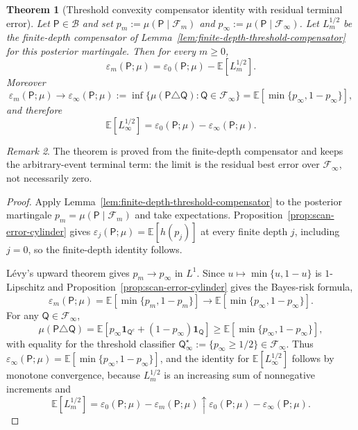 \documentclass{etds}%
\numberwithin{equation}{section}
\theoremstyle{plain}
\newtheorem{theorem}{Theorem}[section]
\theoremstyle{definition}
\theoremstyle{remark}
\newtheorem{remark}[theorem]{Remark}
\newcommand{\EE}{\mathbb{E}}
\newcommand{\ind}{\mathbf{1}}
\begin{document}
\begin{theorem}[Threshold convexity compensator identity with residual terminal error]
\label{thm:scan-tanaka}
Let $\mathsf{P}\in\mathcal{B}$ and set
$p_m:=\mu(\mathsf{P}\mid\mathcal{F}_m)$ and
$p_\infty:=\mu(\mathsf{P}\mid\mathcal{F}_\infty)$.  Let $L_m^{1/2}$ be the
finite-depth compensator of
Lemma~\ref{lem:finite-depth-threshold-compensator} for this posterior
martingale.  Then for every $m\ge0$,
\[
\varepsilon_m(\mathsf{P};\mu)
=\varepsilon_0(\mathsf{P};\mu)-\EE[L_m^{1/2}].
\]
Moreover
\[
\varepsilon_m(\mathsf{P};\mu)\to
\varepsilon_\infty(\mathsf{P};\mu)
:=\inf\{\mu(\mathsf{P}\triangle\mathsf{Q}):\mathsf{Q}\in\mathcal{F}_\infty\}
=\EE[\min\{p_\infty,1-p_\infty\}],
\]
and therefore
\[
\EE[L_\infty^{1/2}]
=\varepsilon_0(\mathsf{P};\mu)-\varepsilon_\infty(\mathsf{P};\mu).
\]
\end{theorem}

\begin{remark}
The theorem is proved from the finite-depth compensator and keeps the
arbitrary-event terminal term: the limit is the residual best error over
$\mathcal{F}_\infty$, not necessarily zero.
\end{remark}

\begin{proof}
Apply Lemma~\ref{lem:finite-depth-threshold-compensator} to the posterior
martingale $p_m=\mu(\mathsf{P}\mid\mathcal{F}_m)$ and take expectations.
Proposition~\ref{prop:scan-error-cylinder} gives
$\varepsilon_j(\mathsf{P};\mu)=\EE[h(p_j)]$ at every finite depth $j$,
including $j=0$, so the finite-depth identity follows.

L\'{e}vy's upward theorem
\cite{Doob1953,Williams1991,Durrett2019} gives $p_m\to p_\infty$ in $L^1$.
Since $u\mapsto\min\{u,1-u\}$ is $1$-Lipschitz and
Proposition~\ref{prop:scan-error-cylinder} gives the Bayes-risk formula,
\[
\varepsilon_m(\mathsf{P};\mu)=\EE[\min\{p_m,1-p_m\}]
\longrightarrow
\EE[\min\{p_\infty,1-p_\infty\}].
\]
For any $\mathsf{Q}\in\mathcal{F}_\infty$,
\[
\mu(\mathsf{P}\triangle\mathsf{Q})
=\EE\!\left[p_\infty\ind_{\mathsf{Q}^c}+(1-p_\infty)\ind_{\mathsf{Q}}\right]
\ge \EE[\min\{p_\infty,1-p_\infty\}],
\]
with equality for the threshold classifier
$\mathsf{Q}_\infty^\star:=\{p_\infty\ge 1/2\}\in\mathcal{F}_\infty$.  Thus
$\varepsilon_\infty(\mathsf{P};\mu)=\EE[\min\{p_\infty,1-p_\infty\}]$, and the
identity for $\EE[L_\infty^{1/2}]$ follows by monotone convergence, because
$L_m^{1/2}$ is an increasing sum of nonnegative increments and
\[
\EE[L_m^{1/2}]
=\varepsilon_0(\mathsf{P};\mu)-\varepsilon_m(\mathsf{P};\mu)
\uparrow
\varepsilon_0(\mathsf{P};\mu)-\varepsilon_\infty(\mathsf{P};\mu).
\]
\end{proof}
\end{document}
